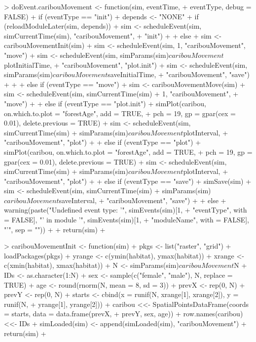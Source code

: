 \documentclass{article}
\begin{document}
\begin{Schunk}
\begin{Soutput}
> doEvent.caribouMovement <- function(sim, eventTime, 
+     eventType, debug = FALSE) {
+     if (eventType == "init") {
+         depends <- "NONE"
+         if (reloadModuleLater(sim, depends)) {
+             sim <- scheduleEvent(sim, simCurrentTime(sim), "caribouMovement", 
+                 "init")
+         }
+         else {
+             sim <- caribouMovementInit(sim)
+             sim <- scheduleEvent(sim, 1, "caribouMovement", "move")
+             sim <- scheduleEvent(sim, simParams(sim)$caribouMovement$plotInitialTime, 
+                 "caribouMovement", "plot.init")
+             sim <- scheduleEvent(sim, simParams(sim)$caribouMovement$saveInitialTime, 
+                 "caribouMovement", "save")
+         }
+     }
+     else if (eventType == "move") {
+         sim <- caribouMovementMove(sim)
+         sim <- scheduleEvent(sim, simCurrentTime(sim) + 1, "caribouMovement", 
+             "move")
+     }
+     else if (eventType == "plot.init") {
+         simPlot(caribou, on.which.to.plot = "forestAge", add = TRUE, 
+             pch = 19, gp = gpar(cex = 0.01), delete.previous = TRUE)
+         sim <- scheduleEvent(sim, simCurrentTime(sim) + simParams(sim)$caribouMovement$plotInterval, 
+             "caribouMovement", "plot")
+     }
+     else if (eventType == "plot") {
+         simPlot(caribou, on.which.to.plot = "forestAge", add = TRUE, 
+             pch = 19, gp = gpar(cex = 0.01), delete.previous = TRUE)
+         sim <- scheduleEvent(sim, simCurrentTime(sim) + simParams(sim)$caribouMovement$plotInterval, 
+             "caribouMovement", "plot")
+     }
+     else if (eventType == "save") {
+         simSave(sim)
+         sim <- scheduleEvent(sim, simCurrentTime(sim) + simParams(sim)$caribouMovement$saveInterval, 
+             "caribouMovement", "save")
+     }
+     else {
+         warning(paste("Undefined event type: '", simEvents(sim)[1, 
+             "eventType", with = FALSE], "' in module '", simEvents(sim)[1, 
+             "moduleName", with = FALSE], "'", sep = ""))
+     }
+     return(sim)
+ }

> caribouMovementInit <- function(sim) {
+     pkgs <- list("raster", "grid")
+     loadPackages(pkgs)
+     yrange <- c(ymin(habitat), ymax(habitat))
+     xrange <- c(xmin(habitat), xmax(habitat))
+     N <- simParams(sim)$caribouMovement$N
+     IDs <- as.character(1:N)
+     sex <- sample(c("female", "male"), N, replace = TRUE)
+     age <- round(rnorm(N, mean = 8, sd = 3))
+     prevX <- rep(0, N)
+     prevY <- rep(0, N)
+     starts <- cbind(x = runif(N, xrange[1], xrange[2]), y = runif(N, 
+         yrange[1], yrange[2]))
+     caribou <<- SpatialPointsDataFrame(coords = starts, data = data.frame(prevX, 
+         prevY, sex, age))
+     row.names(caribou) <<- IDs
+     simLoaded(sim) <- append(simLoaded(sim), "caribouMovement")
+     return(sim)
+ }


\end{Soutput}
\end{Schunk}
\end{document}

